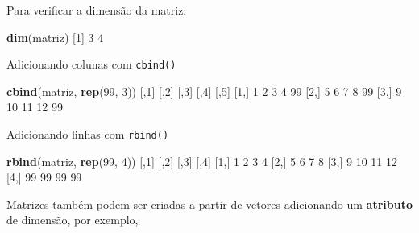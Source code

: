 \documentclass[10pt,a4paper]{book}
\newenvironment{Shaded}{\begin{snugshade}}{\end{snugshade}}
\newcommand{\KeywordTok}[1]{\textcolor[rgb]{0.13,0.29,0.53}{\textbf{#1}}}
\newcommand{\DecValTok}[1]{\textcolor[rgb]{0.00,0.00,0.81}{#1}}
\newcommand{\NormalTok}[1]{#1}
\begin{document}
Para verificar a dimensão da matriz:

\begin{Shaded}
\begin{Highlighting}[]
\KeywordTok{dim}\NormalTok{(matriz)}
\NormalTok{[}\DecValTok{1}\NormalTok{] }\DecValTok{3} \DecValTok{4}
\end{Highlighting}
\end{Shaded}

Adicionando colunas com \texttt{cbind()}

\begin{Shaded}
\begin{Highlighting}[]
\KeywordTok{cbind}\NormalTok{(matriz, }\KeywordTok{rep}\NormalTok{(}\DecValTok{99}\NormalTok{, }\DecValTok{3}\NormalTok{))}
\NormalTok{     [,}\DecValTok{1}\NormalTok{] [,}\DecValTok{2}\NormalTok{] [,}\DecValTok{3}\NormalTok{] [,}\DecValTok{4}\NormalTok{] [,}\DecValTok{5}\NormalTok{]}
\NormalTok{[}\DecValTok{1}\NormalTok{,]    }\DecValTok{1}    \DecValTok{2}    \DecValTok{3}    \DecValTok{4}   \DecValTok{99}
\NormalTok{[}\DecValTok{2}\NormalTok{,]    }\DecValTok{5}    \DecValTok{6}    \DecValTok{7}    \DecValTok{8}   \DecValTok{99}
\NormalTok{[}\DecValTok{3}\NormalTok{,]    }\DecValTok{9}   \DecValTok{10}   \DecValTok{11}   \DecValTok{12}   \DecValTok{99}
\end{Highlighting}
\end{Shaded}

Adicionando linhas com \texttt{rbind()}

\begin{Shaded}
\begin{Highlighting}[]
\KeywordTok{rbind}\NormalTok{(matriz, }\KeywordTok{rep}\NormalTok{(}\DecValTok{99}\NormalTok{, }\DecValTok{4}\NormalTok{))}
\NormalTok{     [,}\DecValTok{1}\NormalTok{] [,}\DecValTok{2}\NormalTok{] [,}\DecValTok{3}\NormalTok{] [,}\DecValTok{4}\NormalTok{]}
\NormalTok{[}\DecValTok{1}\NormalTok{,]    }\DecValTok{1}    \DecValTok{2}    \DecValTok{3}    \DecValTok{4}
\NormalTok{[}\DecValTok{2}\NormalTok{,]    }\DecValTok{5}    \DecValTok{6}    \DecValTok{7}    \DecValTok{8}
\NormalTok{[}\DecValTok{3}\NormalTok{,]    }\DecValTok{9}   \DecValTok{10}   \DecValTok{11}   \DecValTok{12}
\NormalTok{[}\DecValTok{4}\NormalTok{,]   }\DecValTok{99}   \DecValTok{99}   \DecValTok{99}   \DecValTok{99}
\end{Highlighting}
\end{Shaded}

Matrizes também podem ser criadas a partir de vetores adicionando um
\textbf{atributo} de dimensão, por exemplo,
\end{document}
